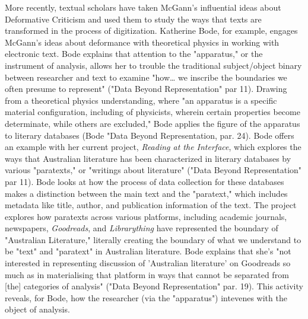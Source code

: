 \documentclass[11pt]{article}
\begin{document}
More recently, textual scholars have taken McGann's influential ideas
about Deformative Criticism and used them to study the ways that texts
are transformed in the process of digitization. Katherine Bode, for
example, engages McGann's ideas about deformance with theoretical
physics in working with electronic text. Bode explains that attention
to the "apparatus," or the instrument of analysis, allows her to
trouble the traditional subject/object binary between researcher and
text to examine "how\ldots{} we inscribe the boundaries we often presume to
represent" ("Data Beyond Representation" par 11). Drawing from a
theoretical physics understanding, where "an apparatus is a specific
material configuration, including of physicists, wherein certain
properties become determinate, while others are excluded," Bode
applies the figure of the apparatus to literary databases (Bode "Data
Beyond Representation, par. 24). Bode offers an example with her
current project, \emph{Reading at the Interface}, which explores the ways
that Australian literature has been characterized in literary
databases by various "paratexts," or "writings about literature"
("Data Beyond Representation" par 11). Bode looks at how the process
of data collection for these databases makes a distinction between the
main text and the "paratext," which includes metadata like title,
author, and publication information of the text. The project explores
how paratexts across various platforms, including academic journals,
newspapers, \emph{Goodreads}, and \emph{Librarything} have represented the
boundary of "Australian Literature," literally creating the boundary
of what we understand to be "text" and "paratext" in Australian
literature. Bode explains that she's "not interested in representing
discussion of 'Australian literature' on Goodreads so much as in
materialising that platform in ways that cannot be separated from
[the] categories of analysis" ("Data Beyond Representation"
par. 19). This activity reveals, for Bode, how the researcher (via the
"apparatus") intevenes with the object of analysis.
\end{document}
